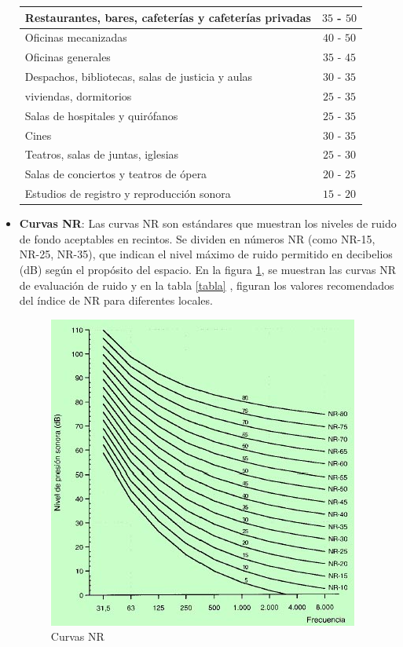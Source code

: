 \begin{itemize}
\begin{table}[H]
\begin{tabular}{|l|c|}
        Restaurantes, bares, cafeterías y cafeterías privadas & $35$ - $50$  \\ \hline
        Oficinas mecanizadas & $40$ - $50$  \\ \hline
        Oficinas generales & $35$ - $45$  \\ \hline
        Despachos, bibliotecas, salas de justicia y aulas & $30$ - $35$ \\ \hline
        viviendas, dormitorios & $25$ - $35$ \\ \hline
        Salas de hospitales y quirófanos & $25$ - $35$  \\ \hline
        Cines & $30$ - $35$\\ \hline
        Teatros, salas de juntas, iglesias & $25$ - $30$ \\ \hline
        Salas de conciertos y teatros de ópera & $20$ - $25$ \\ \hline
        Estudios de registro y reproducción sonora & $15$ - $20$ \\ \hline
        \end{tabular}
    \end{table}

    \item \textbf{Curvas NR}: Las curvas NR son estándares que muestran los niveles de ruido de fondo aceptables en recintos. Se dividen en números NR (como NR-15, NR-25, NR-35), que indican el nivel máximo de ruido permitido en decibelios (dB) según el propósito del espacio.
En la figura \ref{NR}, se muestran las curvas NR de evaluación de ruido y en la tabla \ref{tabla} , figuran los valores recomendados del índice de NR para diferentes locales.\cite{Recuero}

\begin{figure}[H]
    \centering \includegraphics[scale=0.6]{Imagenes/MarcoTeorico/NR.jpg}
    \caption{Curvas NR}
    \label{NR}
\end{figure}


\end{itemize}
